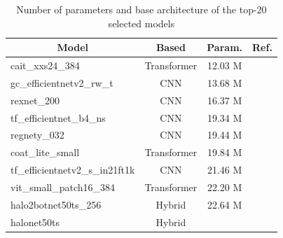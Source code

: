 \documentclass[conference]{IEEEtran}
\begin{document}
\begin{table}[htbp]
\caption{Number of parameters and base architecture of the top-$20$ selected models}
\centering
\begin{tabular}{l|c|c|c} 
\toprule
\multicolumn{1}{c|}{\textbf{Model}} & \textbf{Based} & \textbf{Param.} & \textbf{Ref.}  \\ 
\hline
cait\_xxs24\_384                    & Transformer

 & {12.03 M} & \cite{touvron2021going}                    \\
gc\_efficientnetv2\_rw\_t           & CNN
& {13.68 M} & \cite{tan2021efficientnetv2, cao2019gcnet}                    \\
rexnet\_200                         & CNN
& {16.37 M} & \cite{han2021rethinking}                    \\
tf\_efficientnet\_b4\_ns            & CNN
& {19.34 M} & \cite{tan2019efficientnet, xie2020self}                    \\
regnety\_032                        & CNN
& {19.44 M} & \cite{radosavovic2020designing}                     \\
coat\_lite\_small                   & Transformer

& {19.84 M} & \cite{xu2021co}                    \\
tf\_efficientnetv2\_s\_in21ft1k     & CNN
& {21.46 M} & \cite{tan2021efficientnetv2}                    \\
vit\_small\_patch16\_384            & Transformer

& {22.20 M} & \cite{dosovitskiy2020image, steiner2021train}                    \\
halo2botnet50ts\_256                & Hybrid

& {22.64 M} & \cite{srinivas2021bottleneck, vaswani2021scaling}                    \\
halonet50ts                         & Hybrid


\end{tabular}
\end{table}
\end{document}
